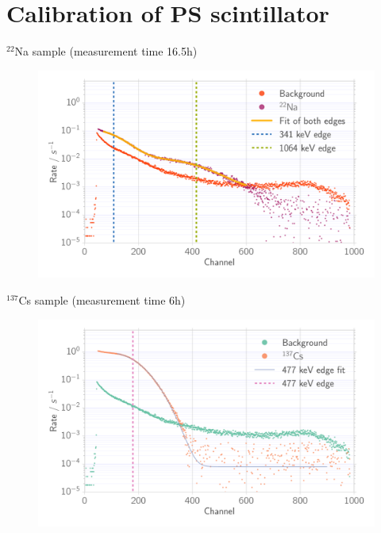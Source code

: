 \documentclass[xcolor=x11names,compress]{beamer}
\renewcommand{\(}{\begin{columns}}
\renewcommand{\)}{\end{columns}}
\newcommand{\<}[1]{\begin{column}{#1}}
\renewcommand{\>}{\end{column}}
\begin{document}
\section{Calibration of PS scintillator}
\begin{frame}[t]{$^{22}$Na sample (measurement time 16.5h) }
\begin{figure}[htpb]
    \centering
    \includegraphics[width=1.0\linewidth]{../analysis/figures/calib_ps_na}
\label{fig:calib_ps_na}
\end{figure}

\end{frame}
\begin{frame}[t]{$^{137}$Cs sample (measurement time 6h) }

\begin{figure}[htpb]
\centering
\includegraphics[width=1.0\linewidth]{../analysis/figures/calib_ps_cs}
\label{fig:calib_ps_cs}
\end{figure}

\end{frame}
\end{document}
